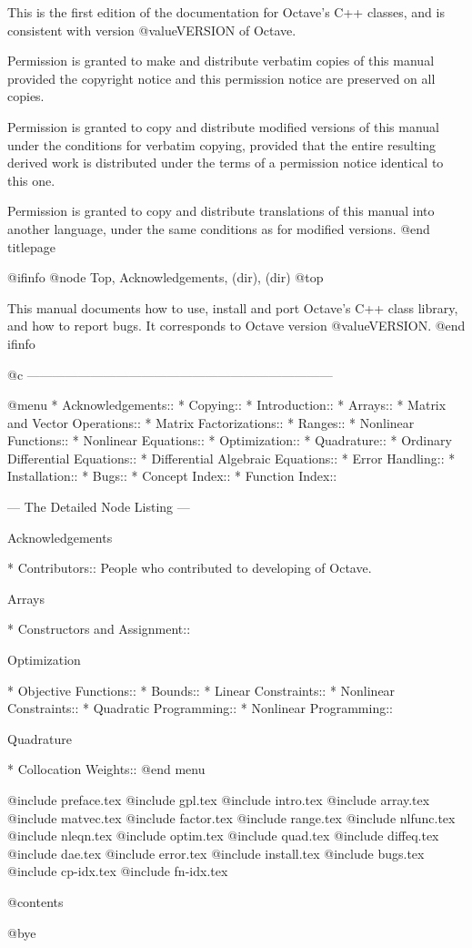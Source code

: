 This is the first edition of the documentation for Octave's C++ classes,
and is consistent with version @value{VERSION} of Octave.

Permission is granted to make and distribute verbatim copies of
this manual provided the copyright notice and this permission notice
are preserved on all copies.

Permission is granted to copy and distribute modified versions of this
manual under the conditions for verbatim copying, provided that the entire
resulting derived work is distributed under the terms of a permission
notice identical to this one.

Permission is granted to copy and distribute translations of this manual
into another language, under the same conditions as for modified versions.
@end titlepage

@ifinfo
@node Top, Acknowledgements, (dir), (dir)
@top

This manual documents how to use, install and port Octave's C++ class
library, and how to report bugs.  It corresponds to Octave version
@value{VERSION}.
@end ifinfo

@c ------------------------------------------------------------------------

@menu
* Acknowledgements::            
* Copying::                     
* Introduction::                
* Arrays::                      
* Matrix and Vector Operations::  
* Matrix Factorizations::       
* Ranges::                      
* Nonlinear Functions::         
* Nonlinear Equations::         
* Optimization::                
* Quadrature::                  
* Ordinary Differential Equations::  
* Differential Algebraic Equations::  
* Error Handling::              
* Installation::                
* Bugs::                        
* Concept Index::               
* Function Index::              

 --- The Detailed Node Listing ---

Acknowledgements

* Contributors::                People who contributed to developing of Octave.

Arrays

* Constructors and Assignment::  

Optimization

* Objective Functions::         
* Bounds::                      
* Linear Constraints::          
* Nonlinear Constraints::       
* Quadratic Programming::       
* Nonlinear Programming::       

Quadrature

* Collocation Weights::         
@end menu

@include preface.tex
@include gpl.tex
@include intro.tex
@include array.tex
@include matvec.tex
@include factor.tex
@include range.tex
@include nlfunc.tex
@include nleqn.tex
@include optim.tex
@include quad.tex
@include diffeq.tex
@include dae.tex
@include error.tex
@include install.tex
@include bugs.tex
@include cp-idx.tex
@include fn-idx.tex

@contents

@bye
